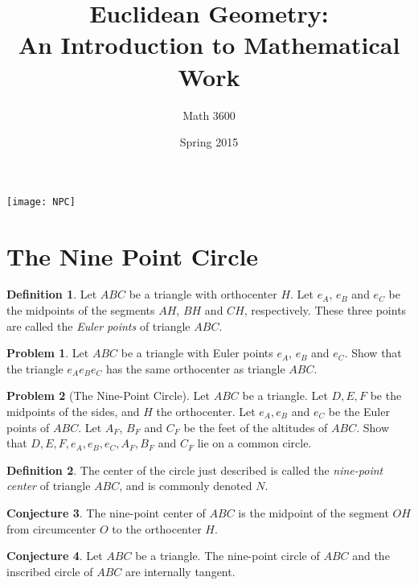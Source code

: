 \documentclass{tufte-handout}
\title{Euclidean Geometry:\\An Introduction to Mathematical Work}
\author[]{Math 3600}
\date{Spring 2015}
\theoremstyle{definition}
\newtheorem{problem}{Problem}[section]
\newtheorem{conjecture}[problem]{Conjecture}
\newtheorem*{definition}{Definition}
\begin{document}
\maketitle

\begin{marginfigure}
    \texttt{[image: NPC]}
\end{marginfigure}

\setcounter{section}{18}
\section{The Nine Point Circle}


\begin{definition} Let $ABC$ be a triangle with orthocenter $H$. Let $e_A$, $e_B$ and $e_C$ be the midpoints of the segments $AH$, $BH$ and $CH$, respectively. These three points are called the \emph{Euler points} of triangle $ABC$.
\end{definition}

\begin{problem} Let $ABC$ be a triangle with Euler points $e_A$, $e_B$ and $e_C$. Show that the triangle $e_A e_B e_C$ has the same orthocenter as triangle $ABC$.
\end{problem}

\begin{problem}[The Nine-Point Circle]\label{prob:nine-pt-circle}
Let $ABC$ be a triangle. Let $D, E, F$ be the midpoints of the sides, and $H$ the orthocenter. Let $e_A, e_B$ and $e_C$ be the Euler points of $ABC$. Let $A_F$, $B_F$ and $C_F$ be the feet of the altitudes of $ABC$. Show that $D, E, F, e_A, e_B, e_C, A_F, B_F$ and $C_F$ lie on a common circle.
\end{problem}



\begin{definition} The center of the circle just described is called the \emph{nine-point center} of triangle $ABC$, and is commonly denoted $N$.
\end{definition}

\begin{conjecture} The nine-point center of $ABC$ is the midpoint of the segment $OH$ from circumcenter $O$ to the orthocenter $H$.
\end{conjecture}

\begin{conjecture} Let $ABC$ be a triangle. The nine-point circle of $ABC$ and the inscribed circle of $ABC$ are internally tangent.
\end{conjecture}

\vfill
\end{document}
